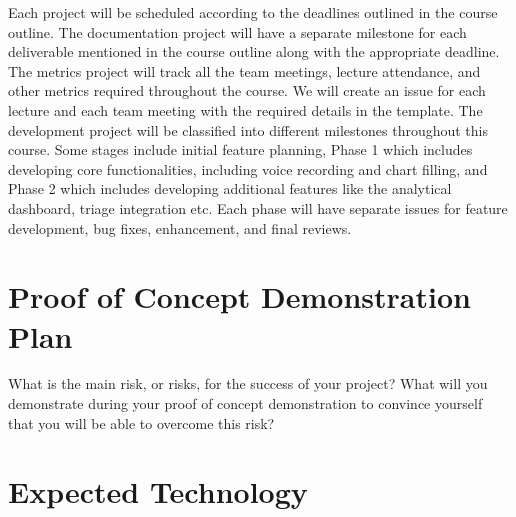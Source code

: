 \documentclass{article}
\begin{document}
Each project will be scheduled according to the deadlines outlined in the course outline. The documentation project will have a separate milestone for each deliverable mentioned in the course outline along with the appropriate deadline. The metrics project will track all the team meetings, lecture attendance, and other metrics required throughout the course. We will create an issue for each lecture and each team meeting with the required details in the template. The development project will be classified into different milestones throughout this course. Some stages include initial feature planning, Phase 1 which includes developing core functionalities, including voice recording and chart filling, and Phase 2 which includes developing additional features like the analytical dashboard, triage integration etc. Each phase will have separate issues for feature development, bug fixes, enhancement, and final reviews. 

\section{Proof of Concept Demonstration Plan}

What is the main risk, or risks, for the success of your project?  What will you
demonstrate during your proof of concept demonstration to convince yourself that
you will be able to overcome this risk?

\section{Expected Technology}


\end{document}
